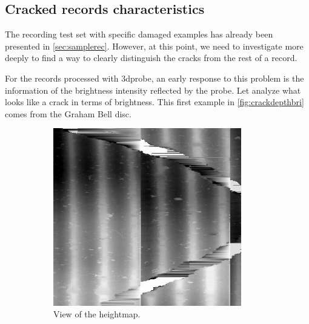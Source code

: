 \subsection{Cracked records characteristics}

The recording test set with specific damaged examples has already been presented in \autoref{sec:samplerec}. However, at this point, we need to investigate more deeply to find a way to clearly distinguish the cracks from the rest of a record.

For the records processed with \gls{3dprobe}, an early response to this problem is the information of the brightness intensity reflected by the probe. Let analyze what looks like a crack in terms of brightness. This first example in \autoref{fig:crackdepthbri} comes from the Graham Bell disc.

\begin{figure}[!ht]
    \centering
    \begin{subfigure}[t]{0.45\textwidth}
    \centering
    \includegraphics[width=0.9\textwidth]{images/bell-crack-raw}
    \caption{View of the heightmap.}
    \label{fig:crackdepth}
    \end{subfigure}
    \begin{subfigure}[t]{0.45\textwidth}
    \centering

\end{subfigure}
\end{figure}
